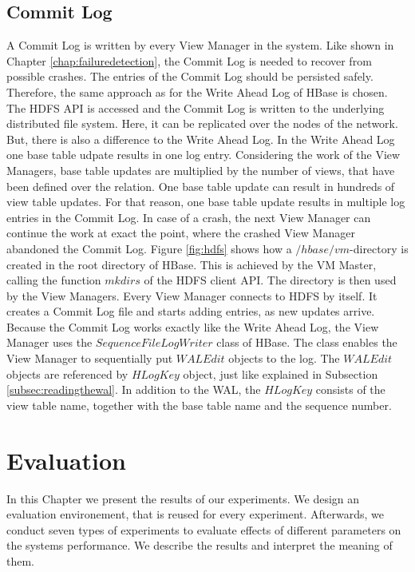 \documentclass[11pt,a4paper,bibtotoc,idxtotoc,headsepline,footsepline,footexclude,BCOR12mm,DIV13]{scrbook}
\begin{document}
\section{Commit Log}

A Commit Log is written by every View Manager in the system. Like shown in Chapter \ref{chap:failuredetection}, the Commit Log is needed to recover from possible crashes. The entries of the Commit Log should be persisted safely. Therefore, the same approach as for the Write Ahead Log of HBase is chosen. The HDFS API is accessed and the Commit Log is written to the underlying distributed file system. Here, it can be replicated over the nodes of the network. But, there is also a difference to the Write Ahead Log. In the Write Ahead Log one base table udpate results in one log entry. Considering the work of the View Managers, base table updates are multiplied by the number of views, that have been defined over the relation. One base table update can result in hundreds of view table updates. For that reason, one base table update results in multiple log entries in the Commit Log. In case of a crash, the next View Manager can continue the work at exact the point, where the crashed View Manager abandoned the Commit Log. Figure \ref{fig:hdfs} shows how a $/hbase/vm$-directory is created in the root directory of HBase. This is achieved by the VM Master, calling the function $mkdirs$ of the HDFS client API. The directory is then used by the View Managers. Every View Manager connects to HDFS by itself. It creates a Commit Log file and starts adding entries, as new updates arrive. Because the Commit Log works exactly like the Write Ahead Log, the View Manager uses the $SequenceFileLogWriter$ class of HBase. The class enables the View Manager to sequentially put $WALEdit$ objects to the log. The $WALEdit$ objects are referenced by $HLogKey$ object, just like explained in Subsection \ref{subsec:readingthewal}. In addition to the WAL, the $HLogKey$ consists of the view table name, together with the base table name and the sequence number.
     



\chapter{Evaluation}
\label{chap:evaluation}

In this Chapter we present the results of our experiments. We design an evaluation environement, that is reused for every experiment. Afterwards, we conduct seven types of experiments to evaluate effects of different parameters on the systems performance. We describe the results and interpret the meaning of them.  \\
\end{document}
